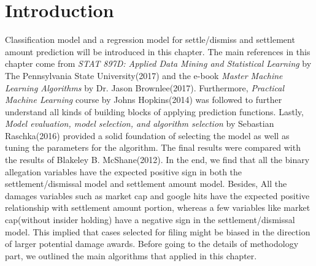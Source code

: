 \section{Introduction}
Classification model and a regression model for settle/dismiss and settlement amount prediction will be introduced in this chapter. The main references in this chapter come from \textit{STAT 897D: Applied Data Mining and Statistical Learning} by The Pennsylvania State University(2017)\hl{\cite{8}} and the e-book \textit{Master Machine Learning Algorithms} by Dr. Jason Brownlee(2017)\hl{\cite{10}}. Furthermore, \textit{Practical Machine Learning} course by Johns Hopkins(2014)\hl{\cite{18}} was followed to further understand all kinds of building blocks of applying prediction functions. Lastly, \textit{Model evaluation, model selection, and algorithm selection} by Sebastian Raschka(2016)\hl{\cite{19}} provided a solid foundation of selecting the model as well as tuning the parameters for the algorithm. The final results were compared with the results of Blakeley B. McShane(2012)\hl{\cite{2}}. In the end, we find that all the binary allegation variables have the expected positive sign in both the settlement/dismissal model and settlement amount model. Besides, All the damages variables such as market cap and google hits have the expected positive relationship with settlement amount portion,  whereas a few variables like market cap(without insider holding) have a negative sign in the settlement/dismissal model. This implied that cases selected for filing might be biased in the direction of larger potential damage awards. Before going to the details of methodology part, we outlined the main algorithms that applied in this chapter.\\
